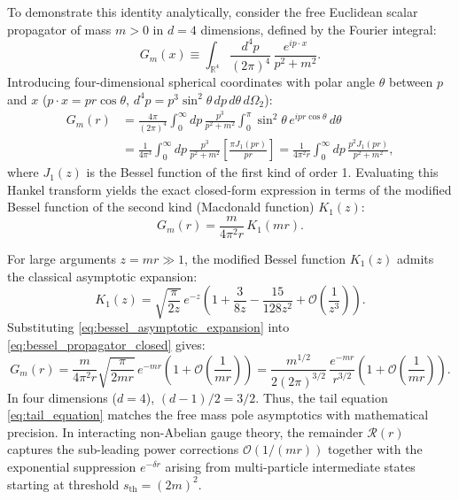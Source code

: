 To demonstrate this identity analytically, consider the free Euclidean scalar propagator of mass $m > 0$ in $d = 4$ dimensions, defined by the Fourier integral:
\begin{equation}
\label{eq:free_scalar_propagator_integral}
G_m(x) \equiv \int_{\mathbb{R}^4} \frac{d^4p}{(2\pi)^4} \, \frac{e^{i p \cdot x}}{p^2 + m^2}.
\end{equation}
Introducing four-dimensional spherical coordinates with polar angle $\theta$ between $p$ and $x$ ($p \cdot x = p r \cos\theta$, $d^4p = p^3 \sin^2\theta \, dp \, d\theta \, d\Omega_2$):
\begin{align}
G_m(r) &= \frac{4\pi}{(2\pi)^4} \int_0^\infty dp \, \frac{p^3}{p^2 + m^2} \int_0^\pi \sin^2\theta \, e^{i p r \cos\theta} \, d\theta \nonumber \\
&= \frac{1}{4\pi^3} \int_0^\infty dp \, \frac{p^3}{p^2 + m^2} \left[ \frac{\pi J_1(p r)}{p r} \right] = \frac{1}{4\pi^2 r} \int_0^\infty dp \, \frac{p^2 J_1(p r)}{p^2 + m^2},
\end{align}
where $J_1(z)$ is the Bessel function of the first kind of order 1. Evaluating this Hankel transform yields the exact closed-form expression in terms of the modified Bessel function of the second kind (Macdonald function) $K_1(z)$:
\begin{equation}
\label{eq:bessel_propagator_closed}
G_m(r) = \frac{m}{4\pi^2 r} \, K_1(m r).
\end{equation}

For large arguments $z = m r \gg 1$, the modified Bessel function $K_1(z)$ admits the classical asymptotic expansion:
\begin{equation}
\label{eq:bessel_asymptotic_expansion}
K_1(z) = \sqrt{\frac{\pi}{2z}} \, e^{-z} \left( 1 + \frac{3}{8z} - \frac{15}{128 z^2} + \mathcal{O}\left( \frac{1}{z^3} \right) \right).
\end{equation}
Substituting \eqref{eq:bessel_asymptotic_expansion} into \eqref{eq:bessel_propagator_closed} gives:
\begin{equation}
\label{eq:propagator_asymptotic_exact}
G_m(r) = \frac{m}{4\pi^2 r} \sqrt{\frac{\pi}{2 m r}} \, e^{-m r} \left( 1 + \mathcal{O}\left( \frac{1}{m r} \right) \right) = \frac{m^{1/2}}{2 (2\pi)^{3/2}} \, \frac{e^{-m r}}{r^{3/2}} \left( 1 + \mathcal{O}\left( \frac{1}{m r} \right) \right).
\end{equation}
In four dimensions ($d = 4$), $(d-1)/2 = 3/2$. Thus, the tail equation \eqref{eq:tail_equation} matches the free mass pole asymptotics with mathematical precision. In interacting non-Abelian gauge theory, the remainder $\mathcal{R}(r)$ captures the sub-leading power corrections $\mathcal{O}(1/(m r))$ together with the exponential suppression $e^{-\delta r}$ arising from multi-particle intermediate states starting at threshold $s_{\mathrm{th}} = (2m)^2$.

